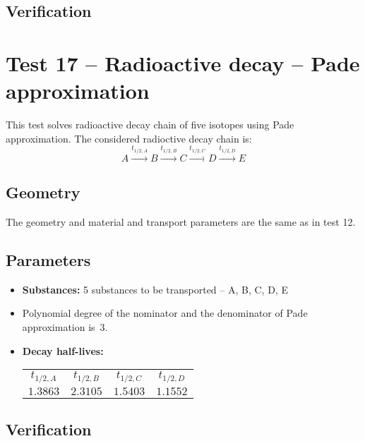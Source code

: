 \subsection*{Verification}




\section{Test 17 -- Radioactive decay -- Pade approximation}
This test solves radioactive decay chain of five isotopes using Pade approximation.
The considered radioctive decay chain is:
\[
 A\xrightarrow{t_{1/2,A}}B\xrightarrow{t_{1/2,B}}C\xrightarrow{t_{1/2,C}}D\xrightarrow{t_{1/2,D}}E
\]

\subsection*{Geometry}
The geometry and material and transport parameters are the same as in test 12.


\subsection*{Parameters}
\begin{itemize}
  \item \textbf{Substances:} 5 substances to be transported -- A, B, C, D, E
  \item Polynomial degree of the nominator and the denominator of Pade approximation is~3.
  \item \textbf{Decay half-lives:} 
    \begin{tabular}[c]{|c|c|c|c|}
      \hline
      $t_{1/2,A}$ & $t_{1/2,B}$  & $t_{1/2,C}$ & $t_{1/2,D}$\\[4pt]
      $1.3863$ & $2.3105$ & $1.5403$ & $1.1552$\\[4pt]
      \hline
    \end{tabular}
\end{itemize}

\subsection*{Verification}



